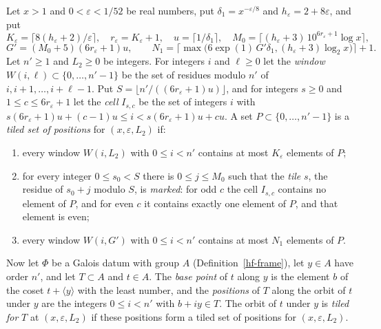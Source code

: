 \begin{definition}\label{hf-good-orbit}
Let $x>1$ and $0<\varepsilon<1/52$ be real numbers, put $\delta_1=x^{-\varepsilon/8}$ and
$h_\varepsilon=2+8\varepsilon$, and put
\[
 K_\varepsilon=\bigl\lceil8(h_\varepsilon+2)/\varepsilon\bigr\rceil,\quad r_\varepsilon=K_\varepsilon+1,\quad
 u=\lceil1/\delta_1\rceil,\quad M_0=\bigl\lceil(h_\varepsilon+3)\,10^{6r_\varepsilon+1}\log x\bigr\rceil,
\]
\[
 G'=(M_0+5)(6r_\varepsilon+1)u,\qquad
 N_1=\bigl\lceil\max\bigl(6\exp(1)\,G'\delta_1,(h_\varepsilon+3)\log_2x\bigr)\bigr\rceil+1.
\]
Let $n'\geq1$ and $L_2\geq0$ be integers. For integers $i$ and $\ell\geq0$ let the \emph{window}
$W(i,\ell)\subset\{0,\ldots,n'-1\}$ be the set of residues modulo $n'$ of $i,i+1,\ldots,i+\ell-1$.
Put $S=\lfloor n'/((6r_\varepsilon+1)u)\rfloor$, and for integers $s\geq0$ and
$1\leq c\leq6r_\varepsilon+1$ let the \emph{cell} $I_{s,c}$ be the set of integers $i$ with
$s(6r_\varepsilon+1)u+(c-1)u\leq i<s(6r_\varepsilon+1)u+cu$. A set $P\subset\{0,\ldots,n'-1\}$ is a
\emph{tiled set of positions} for $(x,\varepsilon,L_2)$ if:
\begin{enumerate}
\item every window $W(i,L_2)$ with $0\leq i<n'$ contains at most $K_\varepsilon$ elements of $P$;
\item for every integer $0\leq s_0<S$ there is $0\leq j\leq M_0$ such that the \emph{tile} $s$, the
  residue of $s_0+j$ modulo $S$, is \emph{marked}: for odd $c$ the cell $I_{s,c}$ contains no element
  of $P$, and for even $c$ it contains exactly one element of $P$, and that element is even;
\item every window $W(i,G')$ with $0\leq i<n'$ contains at most $N_1$ elements of $P$.
\end{enumerate}
Now let $\Phi$ be a Galois datum with group $A$ (Definition~\ref{hf-frame}), let $y\in A$ have order
$n'$, and let $T\subset A$ and $t\in A$. The \emph{base point} of $t$ along $y$ is the element $b$ of
the coset $t+\langle y\rangle$ with the least number, and the \emph{positions} of $T$ along the orbit
of $t$ under $y$ are the integers $0\leq i<n'$ with $b+iy\in T$. The orbit of $t$ under $y$ is
\emph{tiled for} $T$ at $(x,\varepsilon,L_2)$ if these positions form a tiled set of positions for
$(x,\varepsilon,L_2)$.
\end{definition}

